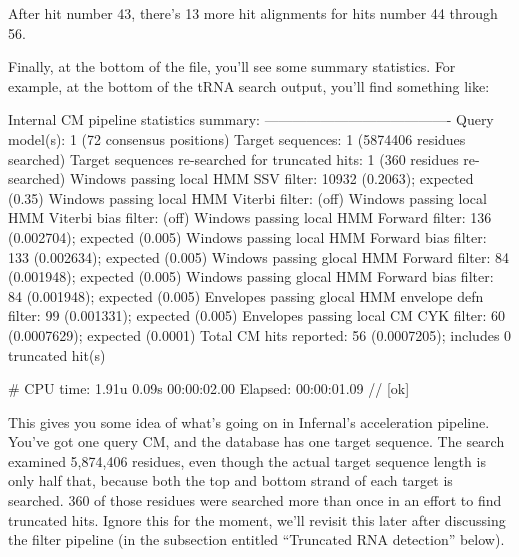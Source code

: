 After hit number 43, there's 13 more hit alignments for hits number 44
through 56. 

Finally, at the bottom of the file, you'll see some summary
statistics. For example, at the bottom of the tRNA search output,
you'll find something like:

\begin{sreoutput}
Internal CM pipeline statistics summary:
----------------------------------------
Query model(s):                                                  1  (72 consensus positions)
Target sequences:                                                1  (5874406 residues searched)
Target sequences re-searched for truncated hits:                 1  (360 residues re-searched)
Windows   passing  local HMM SSV           filter:           10932  (0.2063); expected (0.35)
Windows   passing  local HMM Viterbi       filter:                  (off)
Windows   passing  local HMM Viterbi  bias filter:                  (off)
Windows   passing  local HMM Forward       filter:             136  (0.002704); expected (0.005)
Windows   passing  local HMM Forward  bias filter:             133  (0.002634); expected (0.005)
Windows   passing glocal HMM Forward       filter:              84  (0.001948); expected (0.005)
Windows   passing glocal HMM Forward  bias filter:              84  (0.001948); expected (0.005)
Envelopes passing glocal HMM envelope defn filter:              99  (0.001331); expected (0.005)
Envelopes passing  local CM  CYK           filter:              60  (0.0007629); expected (0.0001)
Total CM hits reported:                                         56  (0.0007205); includes 0 truncated hit(s)

# CPU time: 1.91u 0.09s 00:00:02.00 Elapsed: 00:00:01.09
//
[ok]
\end{sreoutput}

This gives you some idea of what's going on in Infernal's acceleration
pipeline. You've got one query CM, and the database has one target
sequence. The search examined 5,874,406 residues, even though the
actual target sequence length is only half that, because both the top
and bottom strand of each target is searched. 360 of those residues
were searched more than once in an effort to find truncated
hits. Ignore this for the moment, we'll revisit this later after
discussing the filter pipeline (in the subsection entitled ``Truncated
RNA detection'' below).

